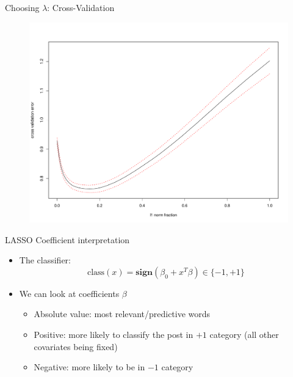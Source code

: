 \documentclass[12pt, trans]{beamer}
\newcommand{\1}[1]{{\mathbf 1}\left\{#1\right\}}        %
\begin{document}
\begin{frame}{Choosing $\lambda$: Cross-Validation}

\begin{figure}
  \centering
  \includegraphics[height=0.9\textheight]{./../../lassoResults/CVPosErr.pdf} 
\end{figure}

\end{frame}


\begin{frame}{LASSO Coefficient interpretation} 

\begin{itemize}[<+->]
\item The classifier:
\[
\text{class}(x) = \textbf{sign}(\beta_0+x^T\beta)\in\{-1,+1\}
\]
\item We can look at coefficients $\beta$

	\begin{itemize}
	\item Absolute value: most relevant/predictive words
	\item Positive: more likely to classify the post in $+1$ category (all other covariates being fixed)
	\item Negative: more likely to be in $-1$ category	
	\end{itemize}
	
\end{itemize}

\end{frame}
\end{document}
